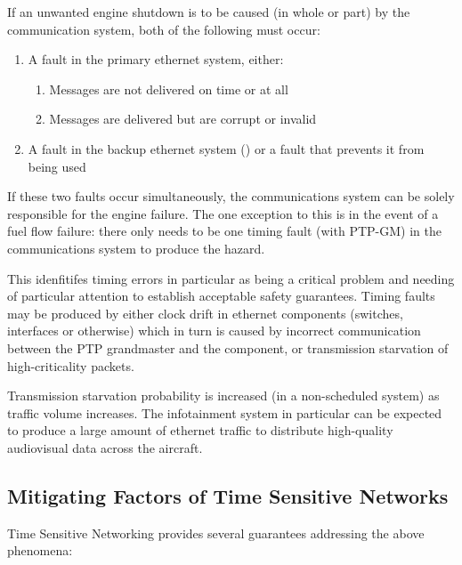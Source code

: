 If an unwanted engine shutdown is to be caused (in whole or part) by the communication system, both of the following must occur:
\begin{enumerate}
    \item A fault in the primary ethernet system, either: \begin{enumerate}
        \item Messages are not delivered on time or at all
        \item Messages are delivered but are corrupt or invalid
    \end{enumerate}
    \item A fault in the backup ethernet system () or a fault that prevents it from being used
\end{enumerate}
If these two faults occur simultaneously, the communications system can be solely responsible for the engine failure.
The one exception to this is in the event of a fuel flow failure: there only needs to be one timing fault (with PTP-GM) in the communications system to produce the hazard.

This idenfitifes timing errors in particular as being a critical problem and needing of particular attention to establish acceptable safety guarantees.
Timing faults may be produced by either clock drift in ethernet components (switches, interfaces or otherwise) which in turn is caused by incorrect communication between the PTP grandmaster and the component, or transmission starvation of high-criticality packets.

Transmission starvation probability is increased (in a non-scheduled system) as traffic volume increases.
The infotainment system in particular can be expected to produce a large amount of ethernet traffic to distribute high-quality audiovisual data across the aircraft.

\subsection{Mitigating Factors of Time Sensitive Networks}

Time Sensitive Networking provides several guarantees addressing the above phenomena:

